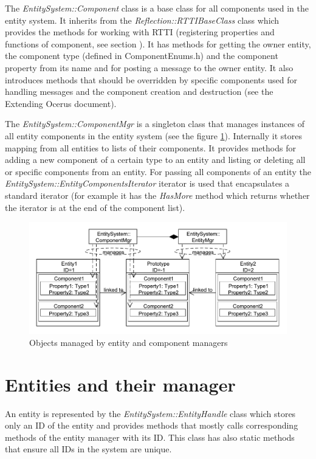 \documentclass[a4paper, 12pt]{report}
\begin{document}
The \emph{EntitySystem::Component} class is a base class for all components used in the entity system. It inherits from the \emph{Reflection::RTTIBaseClass} class which provides the methods for working with RTTI (registering properties and functions of component, see section 
).
It has methods for getting the owner entity, the component type (defined in ComponentEnums.h) and the component property from its name and for posting a message to the owner entity. It also introduces methods that should be overridden by specific components used for handling messages and the component creation and destruction (see the Extending Ocerus document).

The \emph{EntitySystem::ComponentMgr} is a singleton class that manages instances of all entity components in the entity system (see the figure \ref{fig:entity-component-managers-diagram}). Internally it stores mapping from all entities to lists of their components. It provides methods for adding a new component of a certain type to an entity and listing or deleting all or specific components from an entity. For passing all components of an entity the \emph{EntitySystem::EntityComponentsIterator} iterator is used that encapsulates a standard iterator (for example it has the \emph{HasMore} method which returns whether the iterator is at the end of the component list).

\begin{figure}[htbp]
	\centering
		\includegraphics[width=1\textwidth]{EntityAndComponentManagers.pdf}
	\caption{Objects managed by entity and component managers}
	\label{fig:entity-component-managers-diagram}
\end{figure}

\section{Entities and their manager}

An entity is represented by the \emph{EntitySystem::EntityHandle} class which sto\-res only an ID of the entity and provides methods that mostly calls corresponding methods of the entity manager with its ID. This class has also static methods that ensure all IDs in the system are unique.
\end{document}

